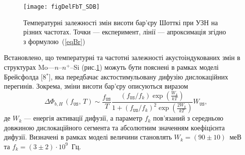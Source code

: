 \begin{figure}[b]
\center
\texttt{[image: figDelFbT\_SDB]}
\caption{\label{figDelFbT_SDB}
Температурні залежності змін висоти бар'єру Шотткі при УЗН на різних частотах.
Точки --- експеримент,
лінії --- апроксимація згідно з формулою~(\ref{eqBr})
}%
\end{figure}
Встановлено, що температурні та частотні залежності акустоіндукованих змін в структурах
 Mo---$n$--$n^+$--Si (рис.\ref{figDelFbT_SDB}) можуть бути пояснені в рамках моделі Брейсфолда
[8$^*$],
яка передбачає акстостимульовану дифузію дислокаційних перегинів.
Зокрема, зміни висоти бар'єру описуються виразом
\begin{equation}
\label{eqBr}
\Delta\Phi_{b,H}\,(f_\mathtt{US},\,T)\sim\frac{f_\mathtt{US}}{T}\frac{(f_\mathtt{US}/{f_k})\exp\left(\frac{W_k}{kT}\right)}
{1+(f_\mathtt{US}/{f_k})^2\exp\left(\frac{2W_k}{kT}\right)}W_\mathtt{US},
\end{equation}
де
$W_k$ --- енергія активації дифузії,
а параметр $f_k$ пов'язаний з середньою довжиною дислокаційного сегмента та абсолютним значенням коефіцієнта дифузії.
Визначені в рамках моделі величини становлять $W_k=(90\pm10)$~меВ та $f_k=(3\pm2)\cdot10^9$~Гц.


